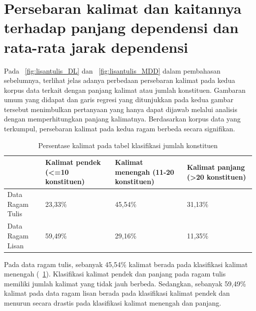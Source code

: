 \section{Persebaran kalimat dan kaitannya terhadap panjang dependensi dan rata-rata jarak dependensi}

Pada \pic~\ref{fig:lisantulis_DL}  dan \pic~\ref{fig:lisantulis_MDD} dalam pembahasan sebelumnya, terlihat jelas adanya perbedaan persebaran kalimat pada kedua korpus data terkait dengan panjang kalimat atau jumlah konstituen. Gambaran umum yang didapat dan garis regresi yang ditunjukkan pada kedua gambar tersebut menimbulkan pertanyaan yang hanya dapat dijawab melalui analisis dengan memperhitungkan panjang kalimatnya. Berdasarkan korpus data yang terkumpul, persebaran kalimat pada kedua ragam berbeda secara signifikan. 

\begin{table}
\begin{center}
\begin{small}
   \caption{Persentase kalimat pada tabel klasifikasi jumlah konstituen}  \label{tab:presentase_kalimat}
  \begin{tabular}{ |p{3cm} | p{3cm} | p{3cm} | p{3cm} |}
    \hline
 & Kalimat pendek \newline (\textless=10 konstituen) & Kalimat menengah (11-20 konstituen) & Kalimat panjang (\textgreater20 konstituen) \\ \hline
Data Ragam Tulis & 23,33\% & 45,54\% & 31,13\% \\ \hline
Data Ragam Lisan & 59,49\% & 29,16\% & 11,35\% \\ \hline
  \end{tabular}
  \end{small}
\end{center}
\end{table}

Pada data ragam tulis, sebanyak 45,54\% kalimat berada pada klasifikasi kalimat menengah (\tab~\ref{tab:presentase_kalimat}). Klasifikasi kalimat pendek dan panjang pada ragam tulis memiliki jumlah kalimat yang tidak jauh berbeda. Sedangkan, sebanyak 59,49\% kalimat pada data ragam lisan berada pada klasifikasi kalimat pendek dan menurun secara drastis pada klasifikasi kalimat menengah dan panjang.  

